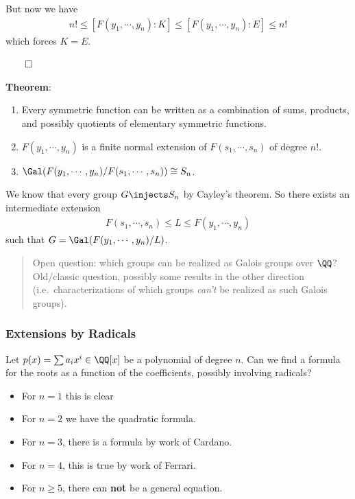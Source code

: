 But now we have
\begin{align*}
n! \leq [F(y_1, \cdots, y_n):K] \leq [F(y_1, \cdots, y_n) : E] \leq n!
\end{align*} which forces \(K=E\).

\(\qed\)

\textbf{Theorem}:

\begin{enumerate}
\def\labelenumi{\arabic{enumi}.}
\item
  Every symmetric function can be written as a combination of sums,
  products, and possibly quotients of elementary symmetric functions.
\item
  \(F(y_1, \cdots, y_n)\) is a finite normal extension of
  \(F(s_1, \cdots, s_n)\) of degree \(n!\).
\item
  \(\Gal(F(y_1, \cdots, y_n) / F(s_1, \cdots, s_n)) \cong S_n\).
\end{enumerate}

We know that every group \(G \injects S_n\) by Cayley's theorem. So
there exists an intermediate extension
\begin{align*}
F(s_1, \cdots, s_n) \leq L \leq F(y_1, \cdots, y_n)
\end{align*} such that \(G = \Gal(F(y_1, \cdots, y_n) / L)\).

\begin{quote}
Open question: which groups can be realized as Galois groups over
\(\QQ\)? Old/classic question, possibly some results in the other
direction (i.e.~characterizations of which groups \emph{can't} be
realized as such Galois groups).
\end{quote}

\hypertarget{extensions-by-radicals}{%
\subsubsection{Extensions by Radicals}\label{extensions-by-radicals}}

Let \(p(x) = \sum a_i x^i \in \QQ[x]\) be a polynomial of degree \(n\).
Can we find a formula for the roots as a function of the coefficients,
possibly involving radicals?

\begin{itemize}
\item
  For \(n = 1\) this is clear
\item
  For \(n=2\) we have the quadratic formula.
\item
  For \(n = 3\), there is a formula by work of Cardano.
\item
  For \(n = 4\), this is true by work of Ferrari.
\item
  For \(n \geq 5\), there can \textbf{not} be a general equation.
\end{itemize}

